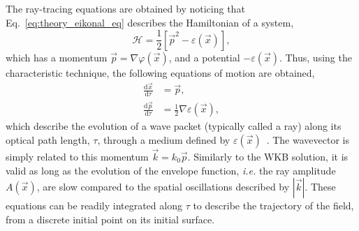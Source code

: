 The ray-tracing equations are obtained by noticing that Eq.~\ref{eq:theory_eikonal_eq} describes the Hamiltonian of a system,
\begin{equation}
    \mathcal{H} = \frac{1}{2} \left[ \vec{p}^2 - \varepsilon(\vec{x}) \right],
\end{equation}
which has a momentum $\vec{p} = \nabla \varphi(\vec{x})$, and a potential $-\varepsilon(\vec{x})$.
Thus, using the characteristic technique, the following equations of motion are obtained,
\begin{align}
    \label{eq:theory_ray_x}
    \frac{\text{d} \vec{x}}{\text{d} \tau}&=\vec{p}, \\
    \label{eq:theory_ray_k}
    \frac{\text{d} \vec{p}}{\text{d} \tau}&=\frac{1}{2} \nabla \varepsilon(\vec{x}),
\end{align}
which describe the evolution of a wave packet (typically called a ray) along its optical path length, $\tau$, through a medium defined by $\varepsilon(\vec{x})$~\cite{colaitis_modeling_2014}.
The wavevector is simply related to this momentum $\vec{k}=k_0\vec{p}$.
Similarly to the WKB solution, it is valid as long as the evolution of the envelope function, \textit{i.e.} the ray amplitude $A(\vec{x})$, are slow compared to the spatial oscillations described by $|\vec{k}|$.
These equations can be readily integrated along $\tau$ to describe the trajectory of the field, from a discrete initial point on its initial surface.

